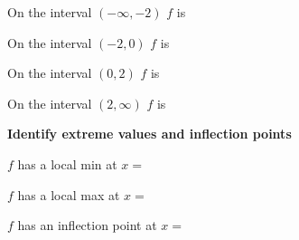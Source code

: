 \documentclass{ximera}
\begin{document}
 \begin{question}

On the interval $(-\infty,-2)$ $f$ is
 
 \begin{multipleChoice}
    \end{multipleChoice} 
    \end{question}  
 \begin{question}
  
    On the interval $(-2,0)$ $f$ is
 \begin{multipleChoice}
    \end{multipleChoice}
\end{question}  
 \begin{question}
On the interval $(0,2)$ $f$ is
 
 \begin{multipleChoice}
    \end{multipleChoice}
    \end{question}
 \begin{question}
    On the interval $(2,\infty)$ $f$ is
 
 \begin{multipleChoice}
    \end{multipleChoice}
    \end{question}
    
 \textbf{Identify extreme values and inflection points}
	
	\begin{question}
		$f$ has a local min at $x=$
	\end{question} 
	
	\begin{question}
		$f$ has a local max at $x=$\answer{-2}
	\end{question} 
	
	\begin{question}
		$f$ has an inflection point at $x=$\answer{0}
	\end{question} 
 
\end{document}

